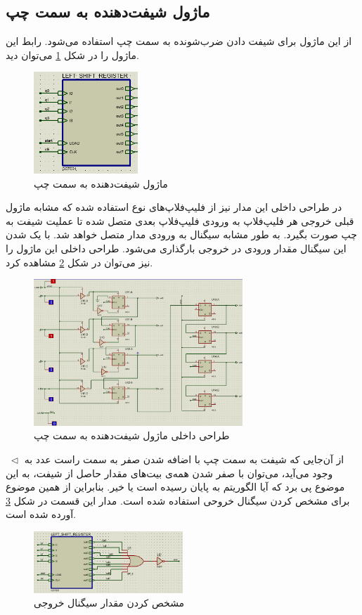 \documentclass[12pt,onecolumn,a4paper,fleqn]{article}
\begin{document}
	\subsection{ماژول شیفت‌دهنده به سمت چپ}
	از این ماژول برای شیفت دادن ضرب‌شونده به سمت چپ استفاده می‌شود. رابط این ماژول را در شکل \ref{fig:lshiftreg} می‌توان دید.
	\begin{figure}[H]
		\centering
		\includegraphics[width=0.35\textwidth]{source/lshiftreg.png}
		\caption{ماژول شیفت‌دهنده به سمت چپ}
		\label{fig:lshiftreg}
	\end{figure}
در طراحی داخلی این مدار نیز از فلیپ‌فلاپ‌های نوع  استفاده شده که مشابه ماژول قبلی خروجی هر فلیپ‌فلاپ به ورودی فلیپ‌فلاپ بعدی متصل شده تا عملیت شیفت به چپ صورت بگیرد. به طور مشابه سیگنال  به ورودی  مدار متصل خواهد شد. با یک شدن این سیگنال مقدار ورودی در خروجی بارگذاری می‌شود. طراحی داخلی این ماژول را نیز می‌توان در شکل \ref{fig:lshiftreg_inner} مشاهده کرد.
	\begin{figure}[H]
		\centering
		\includegraphics[width=0.7\textwidth]{source/lshiftreg_inner.png}
		\caption{طراحی داخلی ماژول شیفت‌دهنده به سمت چپ}
		\label{fig:lshiftreg_inner}
	\end{figure}
	\noindent
	$\;\triangleleft$
	از آن‌جایی که شیفت به سمت چپ با اضافه شدن صفر به سمت راست عدد به وجود می‌آید، می‌توان با صفر شدن همه‌ی بیت‌های مقدار حاصل از شیفت، به این موضوع پی برد که آیا الگوریتم به پایان رسیده است یا خیر. بنابراین از همین موضوع برای مشخص کردن سیگنال خروحی  استفاده شده است. مدار این قسمت در شکل \ref{fig:end_signal} آورده شده است.
	\begin{figure}[H]
		\centering
		\includegraphics[width=0.5\textwidth]{source/end_signal.png}
		\caption{مشخص کردن مقدار سیگنال خروجی }
		\label{fig:end_signal}
	\end{figure}
\end{document}
